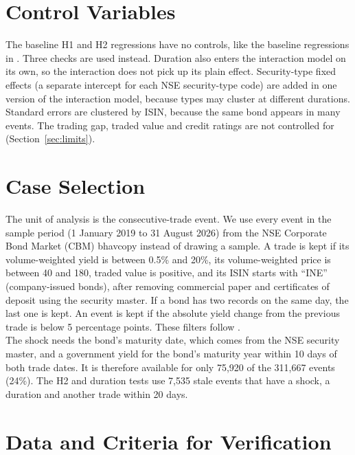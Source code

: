 \documentclass[a4paper,11pt]{article}
\begin{document}
\section{Control Variables}
The baseline H1 and H2 regressions have no controls, like the baseline regressions in \cite{kumar2026delayed}. Three checks are used instead. Duration also enters the interaction model on its own, so the interaction does not pick up its plain effect. Security-type fixed effects (a separate intercept for each NSE security-type code) are added in one version of the interaction model, because types may cluster at different durations. Standard errors are clustered by ISIN, because the same bond appears in many events. The trading gap, traded value and credit ratings are not controlled for (Section~\ref{sec:limits}).

\section{Case Selection}\label{sec:case}
The unit of analysis is the consecutive-trade event. We use every event in the sample period (1 January 2019 to 31 August 2026) from the NSE Corporate Bond Market (CBM) bhavcopy instead of drawing a sample. A trade is kept if its volume-weighted yield is between 0.5\% and 20\%, its volume-weighted price is between 40 and 180, traded value is positive, and its ISIN starts with ``INE'' (company-issued bonds), after removing commercial paper and certificates of deposit using the security master. If a bond has two records on the same day, the last one is kept. An event is kept if the absolute yield change from the previous trade is below 5 percentage points. These filters follow \cite{kumar2026delayed}.\\ The shock needs the bond's maturity date, which comes from the NSE security master, and a government yield for the bond's maturity year within 10 days of both trade dates. It is therefore available for only 75,920 of the 311,667 events (24\%). The H2 and duration tests use 7,535 stale events that have a shock, a duration and another trade within 20 days.


\section{Data and Criteria for Verification}\label{sec:criteria}
\end{document}
